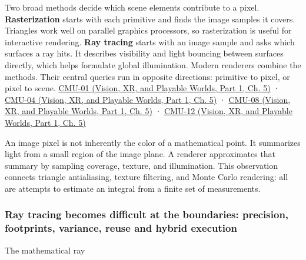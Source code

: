 \hypertarget{03-visual-computing-i-ch001-graphics-is-a-chain-of-representations}{}

Two broad methods decide which scene elements contribute to a pixel. \textbf{Rasterization} starts with each primitive and finds the image samples it covers. Triangles work well on parallel graphics processors, so rasterization is useful for interactive rendering. \textbf{Ray tracing} starts with an image sample and asks which surfaces a ray hits. It describes visibility and light bouncing between surfaces directly, which helps formulate global illumination. Modern renderers combine the methods. Their central queries run in opposite directions: primitive to pixel, or pixel to scene. \href{../07-Vision-XR-and-Playable-Worlds-P01/main.pdf\#nameddest=04-visual-computing-ii-ch036-cmu-01---course-overview}{CMU-01 (Vision, XR, and Playable Worlds, Part 1, Ch. 5)} · \href{../07-Vision-XR-and-Playable-Worlds-P01/main.pdf\#nameddest=04-visual-computing-ii-ch036-cmu-04---drawing-a-triangle-and-an-intro-to-sampling}{CMU-04 (Vision, XR, and Playable Worlds, Part 1, Ch. 5)} · \href{../07-Vision-XR-and-Playable-Worlds-P01/main.pdf\#nameddest=04-visual-computing-ii-ch036-cmu-08---depth-and-transparency}{CMU-08 (Vision, XR, and Playable Worlds, Part 1, Ch. 5)} · \href{../07-Vision-XR-and-Playable-Worlds-P01/main.pdf\#nameddest=04-visual-computing-ii-ch036-cmu-12---geometric-queries}{CMU-12 (Vision, XR, and Playable Worlds, Part 1, Ch. 5)}

An image pixel is not inherently the color of a mathematical point. It summarizes light from a small region of the image plane. A renderer approximates that summary by sampling coverage, texture, and illumination. This observation connects triangle antialiasing, texture filtering, and Monte Carlo rendering: all are attempts to estimate an integral from a finite set of measurements.

\subsubsection{Ray tracing becomes difficult at the boundaries: precision, footprints, variance, reuse and hybrid execution}\label{03-visual-computing-i-ch001-ray-tracing-becomes-difficult-at-the-boundaries-precision-footprints-variance-reuse-and-hybrid-execution}

\hypertarget{03-visual-computing-i-ch001-ray-tracing-becomes-difficult-at-the-boundaries-precision-footprints-variance-reuse-and-hybrid-execution}{}

The mathematical ray

